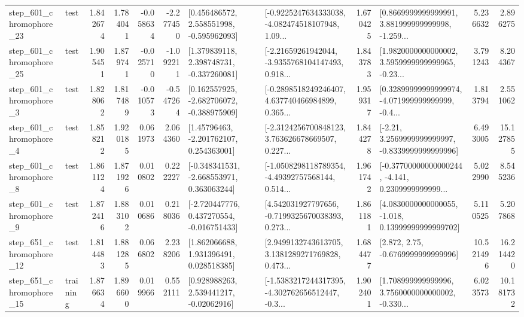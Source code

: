 \begin{tabular}{llrrrrllrlrr}
  step\_601\_chromophore\_23 &      test &      1.842674 &    1.784041 &     -0.058634 & -2.277450 &    [0.456486572, 2.558551998, -0.595962093] &  [-0.9225247634333038, -4.082474518107948, 1.09... &       1.670425 &  [0.8669999999999991, 3.881999999999998, -1.259... &            5.236632 &          2.896275 \\
  step\_601\_chromophore\_25 &      test &      1.905451 &    1.879741 &     -0.025710 & -1.092211 &    [1.379839118, 2.398748731, -0.337260081] &  [-2.21659261942044, -3.9355768104147493, 0.918... &       1.843783 &  [1.9820000000000002, 3.5959999999999965, -0.23... &            3.791243 &          8.204367 \\
   step\_601\_chromophore\_3 &      test &      1.828062 &    1.817489 &     -0.010573 & -0.547264 &   [0.162557925, -2.682706072, -0.388975909] &  [-0.2898518249246407, 4.637740466984899, 0.365... &       1.959317 &  [0.32899999999999974, -4.071999999999999, -0.4... &            1.813794 &          2.551062 \\
   step\_601\_chromophore\_4 &      test &      1.858212 &    1.920185 &      0.061973 &  2.064360 &     [1.45796463, -2.201762107, 0.254363001] &  [-2.3124256700848123, 3.763626678669507, 0.227... &       1.844278 &   [-2.21, 3.2569999999999997, -0.8339999999999996] &            6.493005 &         15.127855 \\
   step\_601\_chromophore\_8 &      test &      1.861124 &    1.871926 &      0.010802 &  0.222227 &   [-0.348341531, -2.668553971, 0.363063244] &  [-1.0508298118789354, -4.49392757568144, 0.514... &       1.961742 &  [-0.37700000000000244, -4.141, 0.2309999999999... &            5.022990 &          8.545236 \\
   step\_601\_chromophore\_9 &      test &      1.872416 &    1.883102 &      0.010686 &  0.218036 &   [-2.720447776, 0.437270554, -0.016751433] &  [4.542031927797656, -0.7199325670038393, 0.273... &       1.861181 &  [4.0830000000000055, -1.018, 0.13999999999999702] &            5.110525 &          5.207868 \\
  step\_651\_chromophore\_12 &      test &      1.814483 &    1.881285 &      0.066802 &  2.238206 &     [1.862066688, 1.931396491, 0.028518385] &  [2.9499132743613705, 3.1381289271769828, 0.473... &       1.684477 &                 [2.872, 2.75, -0.6769999999999996] &           10.521496 &         16.214420 \\
  step\_651\_chromophore\_15 &  training &      1.876634 &    1.896600 &      0.019966 &  0.552111 &     [0.928988263, 2.539441217, -0.02062916] &  [-1.5383217244317395, -4.302762656512447, -0.3... &       1.902401 &  [1.708999999999996, 3.7560000000000002, -0.330... &            6.023573 &         10.181732 \\

\end{tabular}
